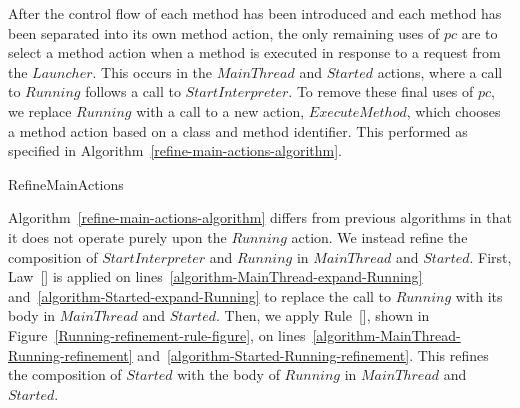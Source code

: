 After the control flow of each method has been introduced and each
method has been separated into its own method action, the only
remaining uses of $pc$ are to select a method action when a method is
executed in response to a request from the $Launcher$.
This occurs in the $MainThread$ and $Started$ actions, where a call to
$Running$ follows a call to $StartInterpreter$.
To remove these final uses of $pc$, we replace $Running$ with a call
to a new action, $ExecuteMethod$, which chooses a method action based
on a class and method identifier.
This performed as specified in
Algorithm~\ref{refine-main-actions-algorithm}.

\begin{algorithm}
  \begin{algorithmic}[1]
    \State {}
    \label{algorithm-MainThread-expand-Running}
    \State {}
    \label{algorithm-Started-expand-Running}
    \State {}
    \label{algorithm-MainThread-Running-refinement}
    \State {}
    \label{algorithm-Started-Running-refinement}
    \State {}
    \label{algorithm-ExecuteMethod-introduction}
    \State {}
    \label{algorithm-MainThread-copy-ExecuteMethod}
    \State {}
    \label{algorithm-Started-copy-ExecuteMethod}
  \end{algorithmic}
  \caption{RefineMainActions}
  \label{refine-main-actions-algorithm}
\end{algorithm}

Algorithm~\ref{refine-main-actions-algorithm} differs from previous
algorithms in that it does not operate purely upon the $Running$
action.
We instead refine the composition of $StartInterpreter$ and $Running$
in $MainThread$ and $Started$.
First, Law~[] is applied on
lines~\ref{algorithm-MainThread-expand-Running}
and~\ref{algorithm-Started-expand-Running} to replace the call to
$Running$ with its body in $MainThread$ and $Started$.
Then, we apply Rule~[], shown in
Figure~\ref{Running-refinement-rule-figure}, on
lines~\ref{algorithm-MainThread-Running-refinement}
and~\ref{algorithm-Started-Running-refinement}.
This refines the composition of $Started$ with the body of $Running$
in $MainThread$ and $Started$.

